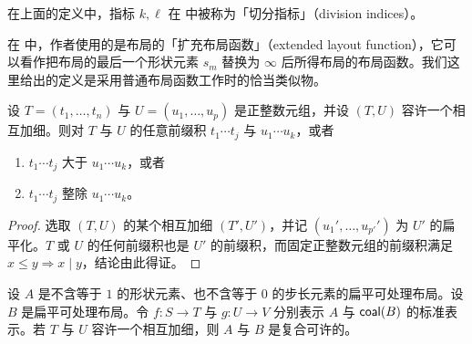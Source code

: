 \begin{remark}
    在上面的定义中，指标 $k,\ell$ 在 \cite{shah2024layout} 中被称为「切分指标」（division indices）。
\end{remark}

\begin{remark}
    在 \cite{shah2024layout} 中，作者使用的是布局的「扩充布局函数」（extended layout function），它可以看作把布局的最后一个形状元素 $s_m$ 替换为 $\infty$ 后所得布局的布局函数。我们这里给出的定义是采用普通布局函数工作时的恰当类似物。
\end{remark}

\begin{lemma}\label{prefixproductdivisibilitylemma}
    设 $T = (t_1,\dots,t_n)$ 与 $U = (u_1, \dots , u_p)$ 是正整数元组，并设 $(T,U)$ 容许一个相互加细。则对 $T$ 与 $U$ 的任意前缀积 $t_1 \cdots t_j$ 与 $u_1 \cdots u_k$，或者
    \begin{enumerate}
        \item $t_1 \cdots t_{j}$ 大于 $u_1 \cdots u_{k}$，或者
        \item $t_1 \cdots t_{j}$ 整除 $u_1 \cdots u_{k}$。
    \end{enumerate}
\end{lemma}

\begin{proof}
    选取 $(T,U)$ 的某个相互加细 $(T',U')$，并记 $(u_1',\dots,u_{p'}')$ 为 $U'$ 的扁平化。$T$ 或 $U$ 的任何前缀积也是 $U'$ 的前缀积，而固定正整数元组的前缀积满足 $x \leq y \Rightarrow x \mid y$，结论由此得证。
\end{proof}

\begin{theorem}
    设 $A$ 是不含等于 $1$ 的形状元素、也不含等于 $0$ 的步长元素的扁平可处理布局。设 $B$ 是扁平可处理布局。令 $f:S \to T$ 与 $g:U \to V$ 分别表示 $A$ 与 $\mathsf{coal}(B)$ 的标准表示。若 $T$ 与 $U$ 容许一个相互加细，则 $A$ 与 $B$ 是复合可许的。
\end{theorem}

